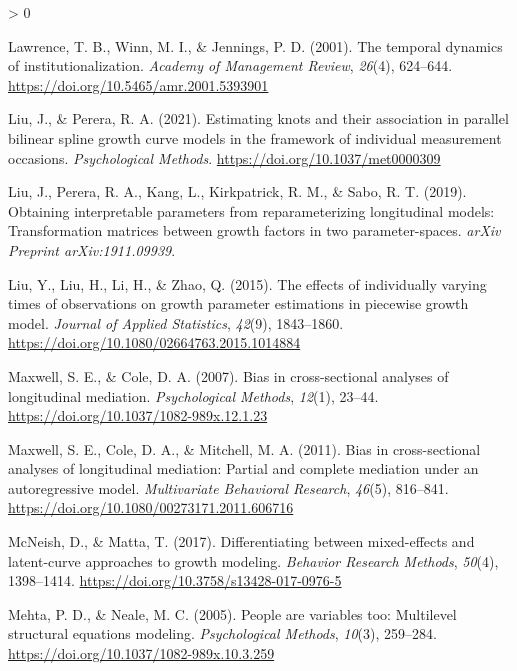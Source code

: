 \documentclass[
12pt, %
twoside,
english]{guelphthesis}
\newlength{\cslhangindent}
\newenvironment{CSLReferences}[2] %
 {%
  \setlength{\parindent}{0pt}
  \ifodd #1 \everypar{\setlength{\hangindent}{\cslhangindent}}\ignorespaces\fi
  \ifnum #2 > 0
  \setlength{\parskip}{\linespacing{2}}
  \fi
 }%
 {}
\begin{document}
\begin{CSLReferences}{1}{0}
\leavevmode{}%
Lawrence, T. B., Winn, M. I., \& Jennings, P. D. (2001). The temporal dynamics of institutionalization. \emph{Academy of Management Review}, \emph{26}(4), 624--644. \url{https://doi.org/10.5465/amr.2001.5393901}

\leavevmode{}%
Liu, J., \& Perera, R. A. (2021). Estimating knots and their association in parallel bilinear spline growth curve models in the framework of individual measurement occasions. \emph{Psychological Methods}. \url{https://doi.org/10.1037/met0000309}

\leavevmode{}%
Liu, J., Perera, R. A., Kang, L., Kirkpatrick, R. M., \& Sabo, R. T. (2019). Obtaining interpretable parameters from reparameterizing longitudinal models: Transformation matrices between growth factors in two parameter-spaces. \emph{arXiv Preprint arXiv:1911.09939}.

\leavevmode{}%
Liu, Y., Liu, H., Li, H., \& Zhao, Q. (2015). The effects of individually varying times of observations on growth parameter estimations in piecewise growth model. \emph{Journal of Applied Statistics}, \emph{42}(9), 1843--1860. \url{https://doi.org/10.1080/02664763.2015.1014884}

\leavevmode{}%
Maxwell, S. E., \& Cole, D. A. (2007). Bias in cross-sectional analyses of longitudinal mediation. \emph{Psychological Methods}, \emph{12}(1), 23--44. \url{https://doi.org/10.1037/1082-989x.12.1.23}

\leavevmode{}%
Maxwell, S. E., Cole, D. A., \& Mitchell, M. A. (2011). Bias in cross-sectional analyses of longitudinal mediation: Partial and complete mediation under an autoregressive model. \emph{Multivariate Behavioral Research}, \emph{46}(5), 816--841. \url{https://doi.org/10.1080/00273171.2011.606716}

\leavevmode{}%
McNeish, D., \& Matta, T. (2017). Differentiating between mixed-effects and latent-curve approaches to growth modeling. \emph{Behavior Research Methods}, \emph{50}(4), 1398--1414. \url{https://doi.org/10.3758/s13428-017-0976-5}

\leavevmode{}%
Mehta, P. D., \& Neale, M. C. (2005). People are variables too: Multilevel structural equations modeling. \emph{Psychological Methods}, \emph{10}(3), 259--284. \url{https://doi.org/10.1037/1082-989x.10.3.259}


\end{CSLReferences}
\end{document}
